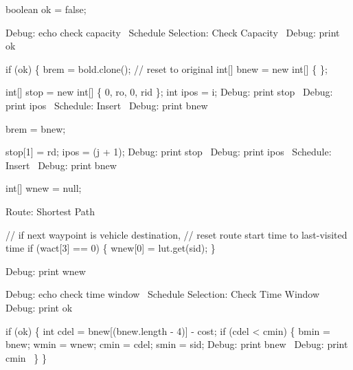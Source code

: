           boolean ok = false;

          \LA{}Debug: echo check capacity~{\nwtagstyle{}}\RA{}
          \LA{}Schedule Selection: Check Capacity~{\nwtagstyle{}}\RA{}
          \LA{}Debug: print ok~{\nwtagstyle{}}\RA{}

          if (ok) \{
            brem = bold.clone();  // reset to original
            int[] bnew = new int[] \{ \};

            int[] stop = new int[] \{ 0, ro, 0, rid \};
            int ipos = i;
            \LA{}Debug: print stop~{\nwtagstyle{}}\RA{}
            \LA{}Debug: print ipos~{\nwtagstyle{}}\RA{}
            \LA{}Schedule: Insert~{\nwtagstyle{}}\RA{}
            \LA{}Debug: print bnew~{\nwtagstyle{}}\RA{}

            brem = bnew;

            stop[1] = rd;
            ipos = (j + 1);
            \LA{}Debug: print stop~{\nwtagstyle{}}\RA{}
            \LA{}Debug: print ipos~{\nwtagstyle{}}\RA{}
            \LA{}Schedule: Insert~{\nwtagstyle{}}\RA{}
            \LA{}Debug: print bnew~{\nwtagstyle{}}\RA{}

            int[] wnew = null;

            \LA{}Route: Shortest Path~{\nwtagstyle{}}\RA{}

            // if next waypoint is vehicle destination,
            // reset route start time to last-visited time
            if (wact[3] == 0) \{
              wnew[0] = lut.get(sid);
            \}

            \LA{}Debug: print wnew~{\nwtagstyle{}}\RA{}

            \LA{}Debug: echo check time window~{\nwtagstyle{}}\RA{}
            \LA{}Schedule Selection: Check Time Window~{\nwtagstyle{}}\RA{}
            \LA{}Debug: print ok~{\nwtagstyle{}}\RA{}

            if (ok) \{
              int cdel = bnew[(bnew.length - 4)] - cost;
              if (cdel < cmin) \{
                bmin = bnew;
                wmin = wnew;
                cmin = cdel;
                smin = sid;
                \LA{}Debug: print bnew~{\nwtagstyle{}}\RA{}
                \LA{}Debug: print cmin~{\nwtagstyle{}}\RA{}
              \}
            \}

